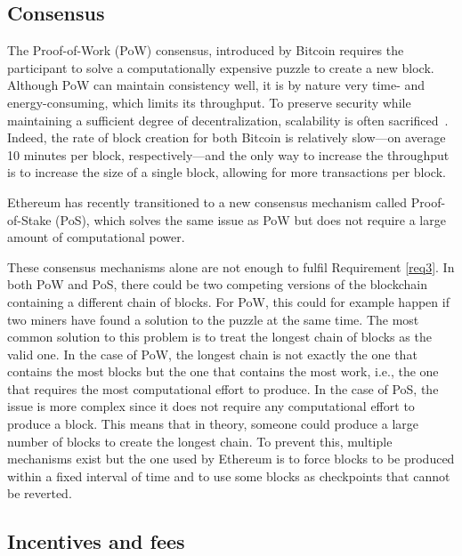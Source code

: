 \subsection{Consensus}
The Proof-of-Work (PoW) consensus, introduced by Bitcoin requires the participant to solve a computationally expensive puzzle to create a new block. Although PoW can maintain consistency well, it is by nature very time- and energy-consuming, which limits its throughput.
To preserve security while maintaining a sufficient degree of decentralization, scalability is often sacrificed~\cite{Xie2019}.
Indeed, the rate of block creation for both Bitcoin is relatively slow---on average 10 minutes per block, respectively---and the only way to increase the throughput is to increase the size of a single block, allowing for more transactions per block.


Ethereum has recently transitioned to a new consensus mechanism called Proof-of-Stake (PoS), which solves the same issue as PoW but does not require a large amount of computational power.

These consensus mechanisms alone are not enough to fulfil Requirement \ref{req3}.
In both PoW and PoS, there could be two competing versions of the blockchain containing a different chain of blocks.
For PoW, this could for example happen if two miners have found a solution to the puzzle at the same time.
The most common solution to this problem is to treat the longest chain of blocks as the valid one.
In the case of PoW, the longest chain is not exactly the one that contains the most blocks but the one that contains the most work, i.e., the one that requires the most computational effort to produce.
In the case of PoS, the issue is more complex since it does not require any computational effort to produce a block.
This means that in theory, someone could produce a large number of blocks to create the longest chain.
To prevent this, multiple mechanisms exist but the one used by Ethereum is to force blocks to be produced within a fixed interval of time and to use some blocks as checkpoints that cannot be reverted.


\subsection{Incentives and fees}

